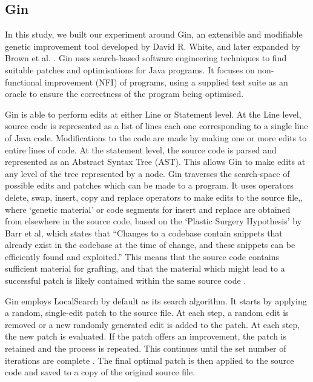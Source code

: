 \documentclass[titlepage]{article}
\begin{document}
\subsection{Gin}
In this study, we built our experiment around Gin, an extensible and modifiable genetic improvement tool developed by David R. White, and later expanded by Brown et al. \cite{petkegin}. Gin uses search-based software engineering techniques to find suitable patches and optimisations for Java programs. It focuses on non-functional improvement (NFI) of programs, using a supplied test suite as an oracle to ensure the correctness of the program being optimised. \cite{gincasestudy}

Gin is able to perform edits at either Line or Statement level. At the Line level, source code is represented as a list of lines each one corresponding to a single line of Java code. Modifications to the code are made by making one or more edits to entire lines of code. At the statement level, the source code is  parsed and represented as an Abstract Syntax Tree (AST). This allows Gin to make edits at any level of the tree represented by a node. 
Gin traverses the search-space of possible edits and patches which can be made to a program. It uses operators delete, swap, insert, copy and replace operators to make edits to the source file,, where ‘genetic material’ or code segments for insert and replace are obtained from elsewhere in the source code, based on the ‘Plastic Surgery Hypothesis’\cite{plasticsurgery} by Barr et al, which states that “Changes to a codebase contain snippets that already exist in the codebase at the time of change, and these snippets can be efficiently found and exploited.” This means that the source code contains sufficient material for grafting, and that the material which might lead to a successful patch is likely contained within the same source code \cite{bobbyblind}. 

Gin employs LocalSearch by default as its search algorithm. It starts by applying a random, single-edit patch to the source file. At each step, a random edit is removed or a new randomly generated edit is added to the patch. At each step, the new patch is evaluated. If the patch offers an improvement, the patch is retained and the process is repeated. This continues until the set number of iterations are complete \cite{petkegin}. The final optimal patch is then applied to the source code and saved to a copy of the original source file. 
\end{document}
